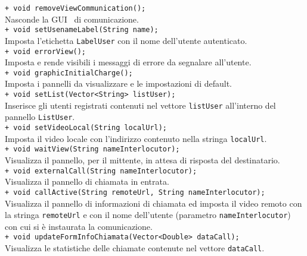 {\begin{sloppypar}
{{\begin{itemize}
					\texttt{+ void removeViewCommunication();} \\
					Nasconde la GUI\g~ di comunicazione.\\

					\texttt{+ void setUsenameLabel(String name);}\\
					Imposta l'etichetta \texttt{LabelUser} con il nome dell'utente autenticato.\\

					\texttt{+ void errorView();}\\
					Imposta e rende visibili i messaggi di errore da segnalare all'utente.\\

					\texttt{+ void graphicInitialCharge();}\\
					Imposta i pannelli da visualizzare e le impostazioni di default. \\

					\texttt{+ void setList(Vector<String> listUser);}\\
					Inserisce gli utenti registrati contenuti nel vettore \texttt{listUser} all'interno del pannello 
					\texttt{ListUser}.\\

					\texttt{+ void setVideoLocal(String localUrl);}\\
					Imposta il video locale con l'indirizzo contenuto nella stringa \texttt{localUrl}.\\

					\texttt{+ void waitView(String nameInterlocutor);}\\
					Visualizza il pannello, per il mittente, in attesa di risposta del destinatario.\\

					\texttt{+ void externalCall(String nameInterlocutor);}\\
					Visualizza il pannello di chiamata in entrata.\\

					\texttt{+ void callActive(String remoteUrl, String nameInterlocutor);}\\
					Visualizza il pannello di informazioni di chiamata ed imposta il video remoto con la stringa 
					\texttt{remoteUrl} e con il nome dell'utente (parametro \texttt{nameInterlocutor}) con cui si è instaurata la comunicazione.\\

					\texttt{+ void updateFormInfoChiamata(Vector<Double> dataCall);}\\
					Visualizza le statistiche delle chiamate contenute nel vettore \texttt{dataCall}.\\


\end{itemize}}}
\end{sloppypar}}
